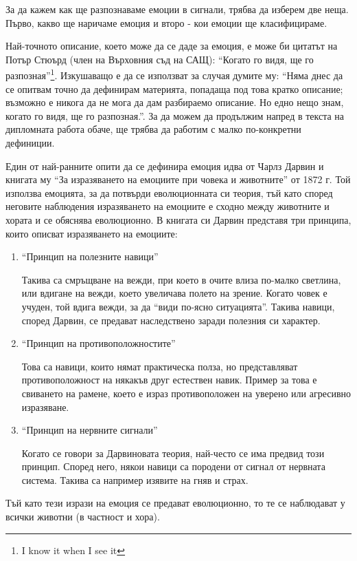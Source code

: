 \documentclass[main.tex]{subfiles}
\begin{document}
За да кажем как ще разпознаваме емоции в сигнали, трябва да изберем две неща. Първо, какво ще наричаме емоция и второ - кои емоции ще класифицираме.

Най-точното описание, което може да се даде за емоция, е може би цитатът на Потър Стюърд (член на Върховния съд на САЩ):  ``Когато го видя, ще го разпозная''\footnote{I know it when I see it}. Изкушаващо е да се използват за случая думите му: ``Няма днес да се опитвам точно да дефинирам материята, попадаща под това кратко описание; възможно е никога да не мога да дам разбираемо описание. Но едно нещо знам, когато го видя, ще го разпозная.''. За да можем да продължим напред в текста на дипломната работа обаче, ще трябва да работим с малко по-конкретни дефиниции.

Един от най-ранните опити да се дефинира емоция идва от Чарлз Дарвин и книгата му ``За изразяването на емоциите при човека и животните'' от 1872 г. 
Той използва емоцията, за да потвърди еволюционната си теория, тъй като според неговите наблюдения изразяването на емоциите е сходно между животните и хората и се обяснява еволюционно. В книгата си Дарвин представя три принципа, които описват изразяването на емоциите:
\begin{enumerate}
    \item ``Принцип на полезните навици''
    
    Такива са смръщване на вежди, при което в очите влиза по-малко светлина, или вдигане на вежди, което увеличава полето на зрение. Когато човек е учуден, той вдига вежди, за да ``види по-ясно ситуацията''. Такива навици, според Дарвин, се предават наследствено заради полезния си характер.
    \item ``Принцип на противоположностите''
    
    Това са навици, които нямат практическа полза, но представляват противоположност на някакъв друг естествен навик. Пример за това е свиването на рамене, което е израз противоположен на уверено или агресивно изразяване.
    
    \item ``Принцип на нервните сигнали''
    
    Когато се говори за Дарвиновата теория, най-често се има предвид този принцип. Според него, някои навици са породени от сигнал от нервната система. Такива са например изявите на гняв и страх.
\end{enumerate}

Тъй като тези изрази на емоция се предават еволюционно, то те се наблюдават у всички животни (в частност и хора). 
\end{document}
